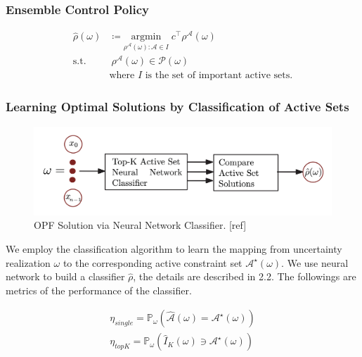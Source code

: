 \documentclass[11pt]{article}
\begin{document}
\subsubsection{Ensemble Control Policy}
\begin{align}\label{eq:opf_predict}
\hat{\rho}\left(\omega\right) & \coloneqq \underset{\rho^{\mathcal{A}}\left(\omega\right):\mathcal{A}\in I}{\mathrm{argmin}} \; c^{\top}\rho^{\mathcal{A}}\left(\omega\right) \\
\textrm{s.t.} 
~ &~ \rho^{\mathcal{A}}\left(\omega\right) \in \mathcal{P}\left(\omega\right) \nonumber \\
& \text{where } I \text{ is the set of important active sets.} \nonumber
\end{align}

\subsubsection{Learning Optimal Solutions by Classification of Active Sets}
\begin{figure}[h]\label{fig:opf_nns}
\centering
\includegraphics[scale=0.2]{report/figure/OPF NNs Classifier.png}
\caption{OPF Solution via Neural Network Classifier. [ref]}
\end{figure}
We employ the classification algorithm to learn the mapping from uncertainty realization $\omega$ to the corresponding active constraint set $\mathcal{A}^{\star}\left( \omega \right)$. We use neural network to build a classifier $\hat{\rho}$, the details are described in 2.2. The followings are metrics of the performance of the classifier.

\begin{align}\label{eq:acc}
\eta_{single} = \mathbb{P}_{\omega}\left(\hat{\mathcal{A}} \left(\omega \right)=\mathcal{A}^{\star}\left(\omega \right) \right) \\
\eta_{topK} = \mathbb{P}_{\omega}\left(\hat{I}_{K} \left(\omega \right) \ni \mathcal{A}^{\star}\left(\omega \right) \right)
\end{align}
\end{document}

